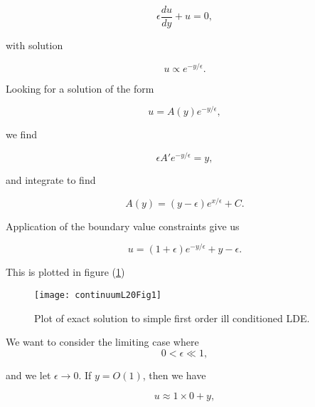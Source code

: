 \begin{equation}\label{eqn:continuumL20:n}
\epsilon \frac{du}{dy} + u = 0,
\end{equation}

with solution

\begin{equation}\label{eqn:continuumL20:n}
u \propto e^{-y/\epsilon}.
\end{equation}

Looking for a solution of the form

\begin{equation}\label{eqn:continuumL20:n}
u = A(y) e^{-y/\epsilon},
\end{equation}

we find

\begin{equation}\label{eqn:continuumL20:n}
\epsilon A' e^{-y/\epsilon} = y,
\end{equation}

and integrate to find

\begin{equation}\label{eqn:continuumL20:n}
A(y) = (y - \epsilon) e^{x/\epsilon} + C.
\end{equation}

Application of the boundary value constraints give us

\begin{equation}\label{eqn:continuumL20:50}
u = ( 1 + \epsilon ) e^{-y/\epsilon} + y - \epsilon.
\end{equation}

This is plotted in figure (\ref{fig:continuumL20:continuumL20Fig1})
\begin{figure}[htp]
   \centering
   \texttt{[image: continuumL20Fig1]}
   \caption{Plot of exact solution to simple first order ill conditioned LDE.}\label{fig:continuumL20:continuumL20Fig1}
\end{figure}

We want to consider the limiting case where 
\begin{equation}\label{eqn:continuumL20:70}
0 < \epsilon \ll 1,
\end{equation}

and we let $\epsilon \rightarrow 0$.  If $y = O(1)$, then we have

\begin{equation}\label{eqn:continuumL20:n}
u \approx 1 \times 0 + y,
\end{equation}

